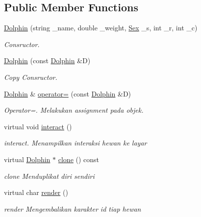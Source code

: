 \subsection*{Public Member Functions}
\begin{DoxyCompactItemize}
\item 
\hyperlink{classDolphin_a8f376b2e32eb805b23f5d5f3048762d0}{Dolphin} (string \+\_\+name, double \+\_\+weight, \hyperlink{sex_8h_a2633cb393c68bb2ee8080db58fb7ba93}{Sex} \+\_\+s, int \+\_\+r, int \+\_\+c)
\begin{DoxyCompactList}\small\item\em Consructor. \end{DoxyCompactList}\item 
\hyperlink{classDolphin_a5b947f871569362a63f5338fc10b0a11}{Dolphin} (const \hyperlink{classDolphin}{Dolphin} \&D)
\begin{DoxyCompactList}\small\item\em Copy Consructor. \end{DoxyCompactList}\item 
\hyperlink{classDolphin}{Dolphin} \& \hyperlink{classDolphin_a62d8e42dd19d6221bac770ae0710bdd7}{operator=} (const \hyperlink{classDolphin}{Dolphin} \&D)
\begin{DoxyCompactList}\small\item\em Operator=. Melakukan assignment pada objek. \end{DoxyCompactList}\item 
virtual void \hyperlink{classDolphin_a6d5b202824f7f12e6286b2b09489c342}{interact} ()
\begin{DoxyCompactList}\small\item\em interact. Menampilkan interaksi hewan ke layar \end{DoxyCompactList}\item 
virtual \hyperlink{classDolphin}{Dolphin} $\ast$ \hyperlink{classDolphin_a77c541ea19646ec22a5461cb9788ccb6}{clone} () const 
\begin{DoxyCompactList}\small\item\em clone Menduplikat diri sendiri \end{DoxyCompactList}\item 
virtual char \hyperlink{classDolphin_aa7c379b5806f594e54021429b99141a9}{render} ()
\begin{DoxyCompactList}\small\item\em render Mengembalikan karakter id tiap hewan \end{DoxyCompactList}\item 

\end{DoxyCompactItemize}
